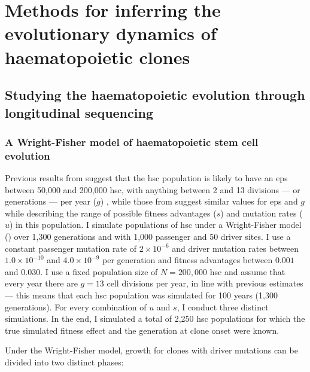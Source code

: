 \chapter{Methods for inferring the evolutionary dynamics of haematopoietic clones}

\section{Studying the haematopoietic evolution through longitudinal sequencing}

\subsection{A Wright-Fisher model of haematopoietic stem cell evolution}

Previous results from  suggest that the \ac{hsc} population is likely to have an \ac{eps} between 50,000 and 200,000 \ac{hsc}, with anything between 2 and 13 divisions --- or generations --- per year ($g$) \cite{Lee-Six2018-lp}, while those from  suggest similar values for \ac{eps} and $g$ while describing the range of possible fitness advantages ($s$) and mutation rates ($u$) in this population. I simulate populations of \ac{hsc} under a Wright-Fisher model () \cite{Beerenwinkel_undated-up} over 1,300 generations and with 1,000 passenger and 50 driver sites. I use a constant passenger mutation rate of $2 \times 10^{-6}$ and driver mutation rates between $1.0 \times 10^{-10}$ and $4.0 \times 10^{-9}$ per generation and fitness advantages between $0.001$ and $0.030$. I use a fixed population size of $N=200,000$ \ac{hsc} and assume that every year there are $g=13$ cell divisions per year, in line with previous estimates \cite{Lee-Six2018-lp,Watson2020-pz} --- this means that each \ac{hsc} population was simulated for 100 years (1,300 generations). For every combination of $u$ and $s$, I conduct three distinct simulations. In the end, I simulated a total of 2,250 \ac{hsc} populations for which the true simulated fitness effect and the generation at clone onset were known. 

\begin{figure}[!ht]
	\label{fig:wf-example}
\end{figure}

Under the Wright-Fisher model, growth for clones with driver mutations can be divided into two distinct phases:

